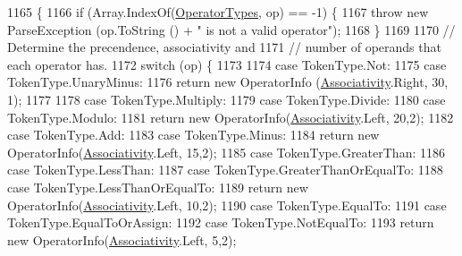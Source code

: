 \begin{DoxyCode}
1165                                                                        \{
1166                 \textcolor{keywordflow}{if} (Array.IndexOf(\hyperlink{a00133_ad8a4bb1b46dbc3d1b7708e78a2d97e1c}{OperatorTypes}, op) == -1) \{
1167                     \textcolor{keywordflow}{throw} \textcolor{keyword}{new} ParseException (op.ToString () + \textcolor{stringliteral}{" is not a valid operator"});
1168                 \}
1169 
1170                 \textcolor{comment}{// Determine the precendence, associativity and}
1171                 \textcolor{comment}{// number of operands that each operator has.}
1172                 \textcolor{keywordflow}{switch} (op) \{
1173 
1174                 \textcolor{keywordflow}{case} TokenType.Not:
1175                 \textcolor{keywordflow}{case} TokenType.UnaryMinus:
1176                     \textcolor{keywordflow}{return} \textcolor{keyword}{new} OperatorInfo (\hyperlink{a00133_a83fa1b8db0e6678006920812b6f33f62}{Associativity}.Right, 30, 1);
1177 
1178                 \textcolor{keywordflow}{case} TokenType.Multiply:
1179                 \textcolor{keywordflow}{case} TokenType.Divide:
1180                 \textcolor{keywordflow}{case} TokenType.Modulo:
1181                     \textcolor{keywordflow}{return} \textcolor{keyword}{new} OperatorInfo(\hyperlink{a00133_a83fa1b8db0e6678006920812b6f33f62}{Associativity}.Left, 20,2);
1182                 \textcolor{keywordflow}{case} TokenType.Add:
1183                 \textcolor{keywordflow}{case} TokenType.Minus:
1184                     \textcolor{keywordflow}{return} \textcolor{keyword}{new} OperatorInfo(\hyperlink{a00133_a83fa1b8db0e6678006920812b6f33f62}{Associativity}.Left, 15,2);
1185                 \textcolor{keywordflow}{case} TokenType.GreaterThan:
1186                 \textcolor{keywordflow}{case} TokenType.LessThan:
1187                 \textcolor{keywordflow}{case} TokenType.GreaterThanOrEqualTo:
1188                 \textcolor{keywordflow}{case} TokenType.LessThanOrEqualTo:
1189                     \textcolor{keywordflow}{return} \textcolor{keyword}{new} OperatorInfo(\hyperlink{a00133_a83fa1b8db0e6678006920812b6f33f62}{Associativity}.Left, 10,2);
1190                 \textcolor{keywordflow}{case} TokenType.EqualTo:
1191                 \textcolor{keywordflow}{case} TokenType.EqualToOrAssign:
1192                 \textcolor{keywordflow}{case} TokenType.NotEqualTo:
1193                     \textcolor{keywordflow}{return} \textcolor{keyword}{new} OperatorInfo(\hyperlink{a00133_a83fa1b8db0e6678006920812b6f33f62}{Associativity}.Left, 5,2);

\end{DoxyCode}
